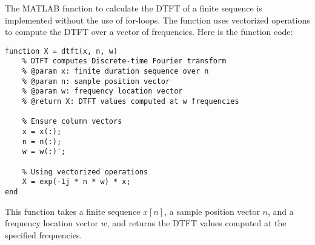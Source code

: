 
\item[(a)]
The MATLAB function to calculate the DTFT of a finite sequence is implemented without the use of for-loops.
The function uses vectorized operations to compute the DTFT over a vector of frequencies.
Here is the function code:

\begin{verbatim}
function X = dtft(x, n, w)
    % DTFT computes Discrete-time Fourier transform
    % @param x: finite duration sequence over n
    % @param n: sample position vector
    % @param w: frequency location vector
    % @return X: DTFT values computed at w frequencies

    % Ensure column vectors
    x = x(:);
    n = n(:);
    w = w(:)';

    % Using vectorized operations
    X = exp(-1j * n * w) * x;
end
\end{verbatim}

This function takes a finite sequence $x[n]$, a sample position vector $n$, and a frequency location vector $w$,
and returns the DTFT values computed at the specified frequencies.
